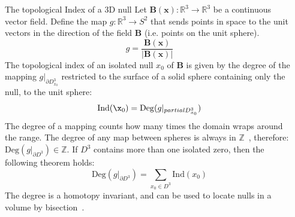\documentclass[final]{beamer}
\newlength{\onecolwid}
\newlength{\twocolwid}
\begin{document}
\begin{frame}[t]
\begin{columns}[t]
\begin{column}{\twocolwid}
\begin{columns}[t,totalwidth=\twocolwid]
\begin{column}{\onecolwid}\vspace{-.6in} %


\begin{block}{The topological Index of a 3D null}
    Let $\mathbf{B}(\mathbf{x}): \mathbb{R}^3\rightarrow \mathbb{R}^3$ be a continuous
    vector field.
    Define the map $g:\mathbb{R}^3\rightarrow S^2$ that sends points in
    space to the unit vectors in the direction of the field $\mathbf{B}$
    (i.e. points on the unit sphere).
    \begin{equation}\label{eq:director}
        g = \frac{\mathbf{B}(\mathbf{x})}{|\mathbf{B}(\mathbf{x})|}
    \end{equation}
    The topological index of an isolated null $x_0$ of $\mathbf{B}$ is given by
    the degree of the mapping $g|_{\partial D^3_{x_0}}$ restricted to the surface of
    a solid sphere containing only the null, to the unit sphere:
    \begin{equation}\label{eq:index1}
        \mathrm{Ind}(\x_0)=\mathrm{Deg}(g|_{partial D^3_{x_0}})
    \end{equation}
    The degree of a mapping counts how many times the domain wraps around the range.
    The degree of any map between spheres is always in
    $\mathbb{Z}$~\cite{brouwer1911abbildung}, therefore:
    $\mathrm{Deg}(g|_{\partial D^3})\in\mathbb{Z}$.
    If $D^3$ contains more than one isolated zero, then the following theorem holds:
    \begin{equation}\label{eq:indextheorem}
        \mathrm{Deg}(g|_{\partial D^3})= \sum_{x_0\in D^3} \mathrm{Ind}(x_0)
    \end{equation}
    The degree is a homotopy invariant, and can be used to locate nulls in a volume by
    bisection~\cite{greene1992locating}.

\end{block}


\end{column} %

\begin{column}{\onecolwid}\vspace{-.6in} %


\end{column}
\end{columns}
\end{column}
\end{columns}
\end{frame}
\end{document}
